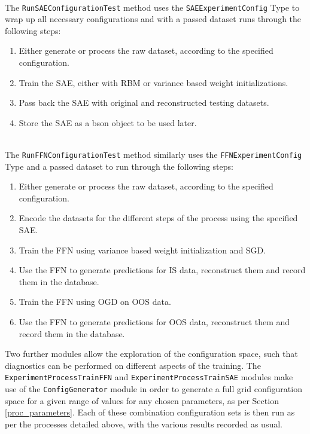 \documentclass[a4paper,11pt,oneside]{article}
\theoremstyle{plain}
\theoremstyle{definition}
\begin{document}
	~\\
	The \texttt{RunSAEConfigurationTest} method uses the \texttt{SAEExperimentConfig} Type to wrap up all necessary configurations and with a passed dataset runs through the following steps:
	\begin{enumerate}
		\item Either generate or process the raw dataset, according to the specified configuration.
		\item Train the SAE, either with RBM or variance based weight initializations.
		\item Pass back the SAE with original and reconstructed testing datasets.
		\item Store the SAE as a bson object to be used later.
	\end{enumerate}
	
	~\\
	The \texttt{RunFFNConfigurationTest} method similarly uses the \texttt{FFNExperimentConfig} Type and a passed dataset to run through the following steps:
	\begin{enumerate}
		\item Either generate or process the raw dataset, according to the specified configuration.
		\item Encode the datasets for the different steps of the process using the specified SAE.
		\item Train the FFN using variance based weight initialization and SGD.
		\item Use the FFN to generate predictions for IS data, reconstruct them and record them in the database.
		\item Train the FFN using OGD on OOS data.
		\item Use the FFN to generate predictions for OOS data, reconstruct them and record them in the database.
	\end{enumerate}
	
	Two further modules allow the exploration of the configuration space, such that diagnostics can be performed on different aspects of the training. 	The \texttt{ExperimentProcessTrainFFN} \citep{DCExperimentProcessTrainFFN} and \texttt{ExperimentProcessTrainSAE} \citep{DCExperimentProcessTrainSAE} modules make use of the \texttt{ConfigGenerator} module \citep{DCGenerator} in order to generate a full grid configuration space for a given range of values for any chosen parameters, as per Section \ref{proc_parameters}. Each of these combination configuration sets is then run as per the processes detailed above, with the various results recorded as usual. 
\end{document}
